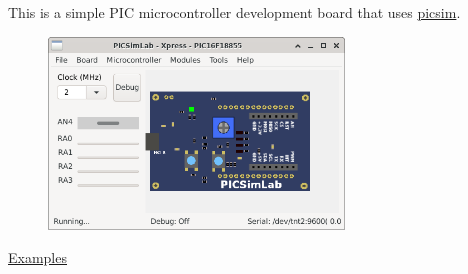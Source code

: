 This is a simple PIC microcontroller development board that uses \href{https://github.com/lcgamboa/picsim}{picsim}.

\begin{figure}[H]
\center
\includegraphics[width=0.7\textwidth]{img/Xpress.png} 
\end{figure} 

\href{https://lcgamboa.github.io/picsimlab_examples/board_Xpress.html}{Examples}


